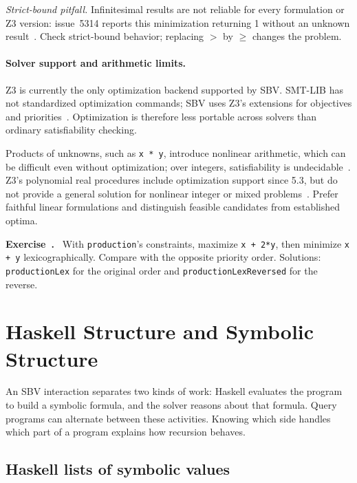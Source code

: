 \documentclass[acmsmall,screen,review,anonymous,nonacm]{acmart}
\newcommand{\code}[1]{\texttt{#1}}
\newcounter{exercise}
\newenvironment{exercise}{\refstepcounter{exercise}\par\medskip\noindent
  \textbf{Exercise~\theexercise.}\ }{\par\medskip}
\begin{document}
\emph{Strict-bound pitfall.} Infinitesimal results are not reliable for every
formulation or Z3 version: issue~5314 reports this minimization returning 1
without an unknown result~\citep{z3strictbounds}. Check strict-bound behavior;
replacing $>$ by $\geq$ changes the problem.

\paragraph{Solver support and arithmetic limits.}
Z3 is currently the only optimization backend supported by SBV. SMT-LIB has
not standardized optimization commands; SBV uses Z3's extensions for objectives
and priorities~\citep{z3optimization}. Optimization is therefore less portable
across solvers than ordinary satisfiability checking.

Products of unknowns, such as \code{x * y}, introduce nonlinear arithmetic,
which can be difficult even without optimization; over integers, satisfiability
is undecidable~\citep{z3arithmetic}. Z3's polynomial real procedures include
optimization support since 5.3, but do not provide a general solution for
nonlinear integer or mixed problems~\citep{z3optimization}. Prefer faithful
linear formulations and distinguish feasible candidates from established optima.

\begin{exercise}
With \code{production}'s constraints, maximize \code{x + 2*y}, then minimize
\code{x + y} lexicographically. Compare with the opposite priority order.
Solutions: \code{productionLex} for the original order and
\code{productionLexReversed} for the reverse.
\end{exercise}

\section{Haskell Structure and Symbolic Structure}
\label{sec:host}

An SBV interaction separates two kinds of work: Haskell evaluates the program
to build a symbolic formula, and the solver reasons about that formula. Query
programs can alternate between these activities. Knowing which side handles
which part of a program explains how recursion behaves.

\subsection{Haskell lists of symbolic values}
\end{document}
